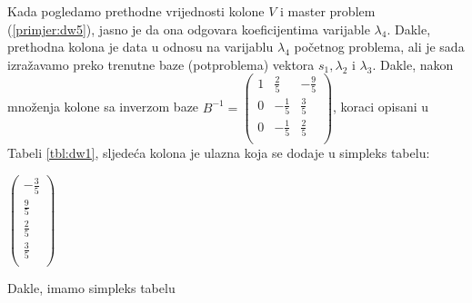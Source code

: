 \documentclass[a4paper, utf8, 11pt, colorlinks]{book}
\theoremstyle{definition}
\begin{document}
Kada pogledamo prethodne vrijednosti kolone $V$ i master problem (\ref{primjer:dw5}), jasno je da ona odgovara koeficijentima varijable $\lambda_4$. Dakle, prethodna kolona je data u odnosu na varijablu $\lambda_4$ početnog problema, ali je sada izražavamo preko trenutne baze (potproblema) vektora $s_1, \lambda_2$ i $\lambda_3$.  Dakle, nakon množenja kolone sa inverzom baze 
$B^{-1}= 
\begin{pmatrix}
	 1 &  \frac{2}{5}   & -\frac{9}{5} \\
	 0 &  -\frac{1}{5}  & \frac{3}{5}  \\
	 0 &  -\frac{1}{5}  & \frac{2}{5}  \\ 
\end{pmatrix} $, koraci opisani u Tabeli \ref{tbl:dw1}, sljedeća kolona je ulazna koja se dodaje u simpleks tabelu:

\begin{center}
	
	$\begin{pmatrix}
		-\frac{3}{5}            \\
		\frac{9}{5}     \\
		 \frac{2}{5}       \\
		\frac{3}{5}    \\
	\end{pmatrix}$
\end{center}
Dakle, imamo simpleks tabelu 
\end{document}
